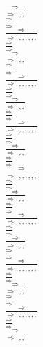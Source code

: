 \documentclass[11pt]{article}
\begin{document}
\begin{center}
\bigskip
\\$\frac{\Rightarrow }{\Rightarrow , , , }$
\bigskip
\\$\frac{\Rightarrow }{\Rightarrow }$
\bigskip
\\$\frac{\Rightarrow }{\Rightarrow , , , , , , , }$
\bigskip
\\$\frac{\Rightarrow }{\Rightarrow }$
\bigskip
\\$\frac{\Rightarrow }{\Rightarrow , , , }$
\bigskip
\\$\frac{\Rightarrow }{\Rightarrow }$
\bigskip
\\$\frac{\Rightarrow }{\Rightarrow , , , , , , , }$
\bigskip
\\$\frac{\Rightarrow }{\Rightarrow }$
\bigskip
\\$\frac{\Rightarrow }{\Rightarrow , , , }$
\bigskip
\\$\frac{\Rightarrow }{\Rightarrow }$
\bigskip
\\$\frac{\Rightarrow }{\Rightarrow , , , , , , , }$
\bigskip
\\$\frac{\Rightarrow }{\Rightarrow }$
\bigskip
\\$\frac{\Rightarrow }{\Rightarrow , , , }$
\bigskip
\\$\frac{\Rightarrow }{\Rightarrow }$
\bigskip
\\$\frac{\Rightarrow }{\Rightarrow , , , , , , , }$
\bigskip
\\$\frac{\Rightarrow }{\Rightarrow }$
\bigskip
\\$\frac{\Rightarrow }{\Rightarrow , , , }$
\bigskip
\\$\frac{\Rightarrow }{\Rightarrow }$
\bigskip
\\$\frac{\Rightarrow }{\Rightarrow , , , , , , , }$
\bigskip
\\$\frac{\Rightarrow }{\Rightarrow }$
\bigskip
\\$\frac{\Rightarrow }{\Rightarrow , , , }$
\bigskip
\\$\frac{\Rightarrow }{\Rightarrow }$
\bigskip
\\$\frac{\Rightarrow }{\Rightarrow , , , , , , , }$
\bigskip
\\$\frac{\Rightarrow }{\Rightarrow }$
\bigskip
\\$\frac{\Rightarrow }{\Rightarrow , , , }$
\bigskip
\\$\frac{\Rightarrow }{\Rightarrow }$
\bigskip
\\$\frac{\Rightarrow }{\Rightarrow , , , , , , , }$
\bigskip
\\$\frac{\Rightarrow }{\Rightarrow }$
\bigskip
\\$\frac{\Rightarrow }{\Rightarrow , , , }$

\end{center}
\end{document}
